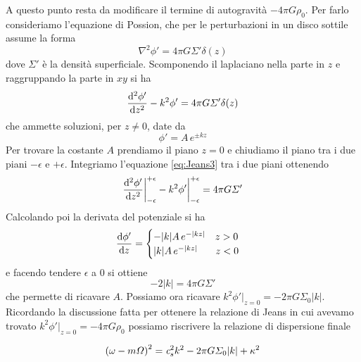 A questo punto resta da modificare il termine di autogravità $- 4\pi G \rho_0 $. Per farlo consideriamo l'equazione di Possion, che per le perturbazioni in un disco sottile assume la forma
\begin{equation}
\nabla^2\phi' = 4 \pi G \Sigma' \delta(z)
\end{equation}
dove  $\Sigma'$ è la densità superficiale. Scomponendo il laplaciano nella parte in $z$ e raggruppando la parte in $xy$ si ha
\begin{align}
\dfrac{\mathrm{d}^{2} {\phi'}}{\mathrm{d} {z}^{2}} - k^2 \phi' = 4\pi G \Sigma' \delta(z) \label{eq:Jeans3}
\end{align}
che ammette soluzioni, per $z\neq 0 $, date da
\begin{equation}
\phi' = A\,e^{\pm kz}
\end{equation}
Per trovare la costante $A$ prendiamo il piano $z=0$ e chiudiamo il piano tra i due piani $-\epsilon$ e $+\epsilon$. Integriamo l'equazione \ref{eq:Jeans3} tra i due piani ottenendo 
\begin{equation}
\dfrac{\mathrm{d}^{2} {\phi'}}{\mathrm{d} {z}^{2}}\bigg|_{-\epsilon}^{+\epsilon} - k^2 \phi'\bigg|_{-\epsilon}^{+\epsilon} = 4\pi G \Sigma'
\end{equation}
Calcolando poi la derivata del potenziale si ha
\begin{equation}
\dfrac{\mathrm{d} {\phi'}}{\mathrm{d} {z}}= \begin{cases}
-|k| A\,e^{- |kz|} \,\,\,\,\,\, z>0\\
|k| A\,e^{- |kz|} \,\,\,\,\,\,\,\,\,\,\,  z<0
\end{cases}
\end{equation}
e facendo tendere $\epsilon$ a $0$ si ottiene
\begin{equation}
-2|k|= 4\pi G \Sigma'
\end{equation}
che permette di ricavare $A$. Possiamo ora ricavare $k^2\phi'\big|_{z=0} = -2\pi G \Sigma_0 |k|$. Ricordando la discussione fatta per ottenere la relazione di Jeans in cui avevamo trovato $k^2\phi'\big|_{z=0} = -4\pi G \rho_0$ possiamo riscrivere la relazione di dispersione finale
\begin{EQ}
\begin{equation}
\left( \omega -m\Omega\right)^2 = \textit{c}_{s}^2 k^2 - 2\pi G \Sigma_0 |k| + \kappa^2 \label{eq:LinShu}
\end{equation}
\end{EQ}
